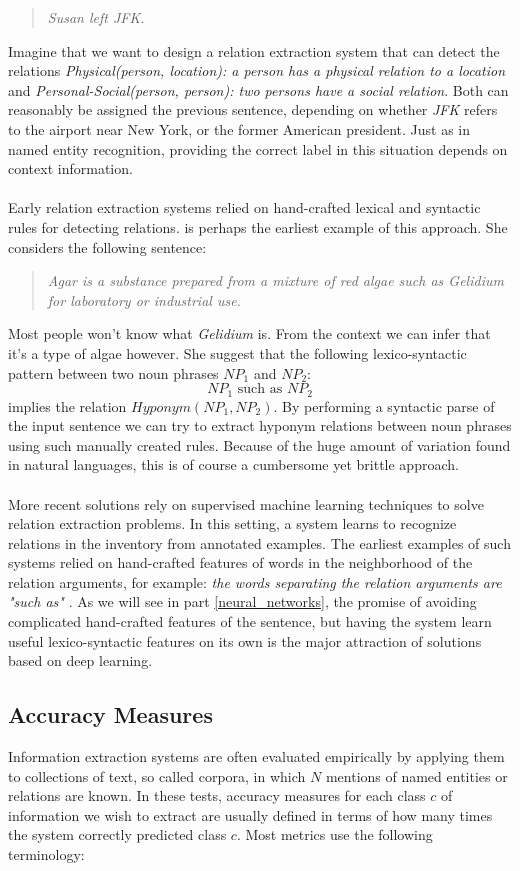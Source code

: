 \begin{quote}
	\textit{Susan left JFK.}
\end{quote}
Imagine that we want to design a relation extraction system that can detect the relations \textit{Physical(person, location): a person has a physical relation to a location} and \textit{Personal-Social(person, person): two persons have a social relation}. Both can reasonably be assigned the previous sentence, depending on whether \textit{JFK} refers to the airport near New York, or the former American president. Just as in named entity recognition, providing the correct label in this situation depends on context information.
\\\\
Early relation extraction systems relied on hand-crafted lexical and syntactic rules for detecting relations. \citet{hearst1992} is perhaps the earliest example of this approach. She considers the following sentence:
\begin{quote}
	\textit{Agar is a substance prepared from a mixture of red algae such as Gelidium for laboratory or industrial use.}
\end{quote}
Most people won't know what \textit{Gelidium} is. From the context we can infer that it's a type of algae however. She suggest that the following lexico-syntactic pattern between two noun phrases $NP_1$ and $NP_2$:
$$
NP_1\text{ such as }NP_2
$$
implies the relation $Hyponym(NP_1, NP_2)$. By performing a syntactic parse of the input sentence we can try to extract hyponym relations between noun phrases using such manually created rules. Because of the huge amount of variation found in natural languages, this is of course a cumbersome yet brittle approach.
\\\\
More recent solutions rely on supervised machine learning techniques to solve relation extraction problems. In this setting, a system learns to recognize relations in the inventory from annotated examples. The earliest examples of such systems relied on hand-crafted features of words in the neighborhood of the relation arguments, for example: \textit{the words separating the relation arguments are "such as"} \citep{jurafsky09}. As we will see in part \ref{neural_networks}, the promise of avoiding complicated hand-crafted features of the sentence, but having the system learn useful lexico-syntactic features on its own is the major attraction of solutions based on deep learning.

\subsection{Accuracy Measures}
Information extraction systems are often evaluated empirically by applying them to collections of text, so called corpora, in which $N$ mentions of named entities or relations are known. In these tests, accuracy measures for each class $c$ of information we wish to extract are usually defined in terms of how many times the system correctly predicted class $c$. Most metrics use the following terminology:

